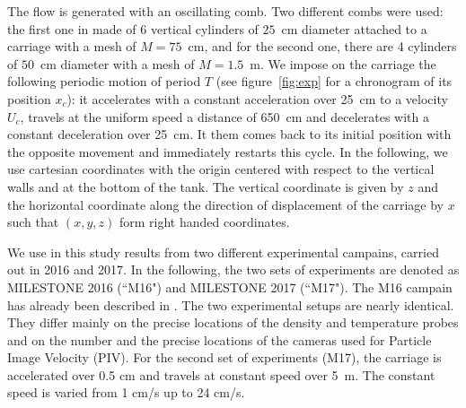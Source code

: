 The flow is generated with an oscillating comb. Two different combs were used:
the first one in made of 6 vertical cylinders of $25$~cm diameter attached to a
carriage with a mesh of $M=75$~cm, and for the second one, there are 4
cylinders of $50$~cm diameter with a mesh of $M=1.5$~m. We impose on the
carriage the following periodic motion of period $T$ (see figure~\ref{fig:exp}
for a chronogram of its position $x_c$): it accelerates with a constant
acceleration over 25~cm to a velocity $U_c$, travels at the uniform speed a
distance of 650~cm and decelerates with a constant deceleration over 25~cm. It
them comes back to its initial position with the opposite movement and
immediately restarts this cycle. In the following, we use cartesian coordinates
with the origin centered with respect to the vertical walls and at the bottom
of the tank. The vertical coordinate is given by $z$ and the horizontal
coordinate along the direction of displacement of the carriage by $x$ such that
$(x,y,z)$ form right handed coordinates.

We use in this study results from two different experimental campains, carried
out in 2016 and 2017. In the following, the two sets of experiments are denoted
as MILESTONE 2016 (``M16") and MILESTONE 2017 (``M17"). The M16 campain has
already been described in \cite{campagne2016}. 
The two experimental setups are
nearly identical. They differ mainly on the precise locations of the density
and temperature probes and on the number and the precise locations of the
cameras used for Particle Image Velocity (PIV). For the second set of
experiments (M17), the carriage is accelerated over 0.5 cm and travels at
constant speed over 5~m. The constant speed is varied from 1 cm/s up to 24
cm/s.

